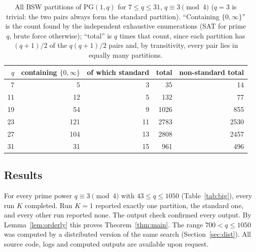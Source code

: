 \documentclass[11pt,a4paper]{article}
\theoremstyle{definition}
\theoremstyle{remark}
\newcommand{\PG}{\mathrm{PG}}
\begin{document}
\begin{table}[ht]
\centering
\caption{All BSW partitions of $\PG(1,q)$ for $7\le q\le 31$, $q\equiv 3\pmod 4$ ($q=3$ is trivial: the two pairs always form the standard partition). ``Containing $\{0,\infty\}$'' is the
count found by the independent exhaustive enumerations (SAT for prime $q$, brute force otherwise); ``total'' is $q$ times that count, since each partition has $(q+1)/2$ of the $q(q+1)/2$ pairs and,
by transitivity, every pair lies in equally many partitions.}
\label{tab:small}
\begin{tabular}{rrrrr}
\toprule
$q$ & containing $\{0,\infty\}$ & of which standard & total & non-standard total\\
\midrule
7 & 5 & 3 & 35 & 14\\
11 & 12 & 5 & 132 & 77\\
19 & 54 & 9 & 1026 & 855\\
23 & 121 & 11 & 2783 & 2530\\
27 & 104 & 13 & 2808 & 2457\\
31 & 31 & 15 & 961 & 496\\
\bottomrule
\end{tabular}
\end{table}

\subsection{Results}

For every prime power $q\equiv3\pmod4$ with $43\le q\le1050$ (Table~\ref{tab:big}), every run $K$ completed.
Run $K=1$ reported exactly one partition, the standard one, and every other run reported none. The output check
confirmed every output. By Lemma~\ref{lem:orderly} this proves Theorem~\ref{thm:main}. The range
$700<q\le1050$ was computed by a distributed version of the same search (Section~\ref{sec:dist}). All source
code, logs and computed outputs are available upon request.
\end{document}
